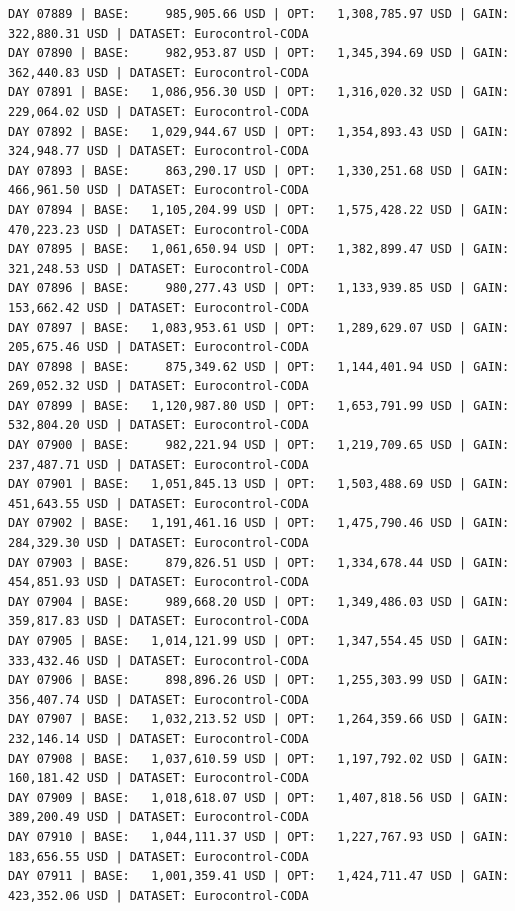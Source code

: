 \documentclass[11pt,a4paper]{article}
\begin{document}
\begin{verbatim}
DAY 07889 | BASE:     985,905.66 USD | OPT:   1,308,785.97 USD | GAIN: 322,880.31 USD | DATASET: Eurocontrol-CODA
DAY 07890 | BASE:     982,953.87 USD | OPT:   1,345,394.69 USD | GAIN: 362,440.83 USD | DATASET: Eurocontrol-CODA
DAY 07891 | BASE:   1,086,956.30 USD | OPT:   1,316,020.32 USD | GAIN: 229,064.02 USD | DATASET: Eurocontrol-CODA
DAY 07892 | BASE:   1,029,944.67 USD | OPT:   1,354,893.43 USD | GAIN: 324,948.77 USD | DATASET: Eurocontrol-CODA
DAY 07893 | BASE:     863,290.17 USD | OPT:   1,330,251.68 USD | GAIN: 466,961.50 USD | DATASET: Eurocontrol-CODA
DAY 07894 | BASE:   1,105,204.99 USD | OPT:   1,575,428.22 USD | GAIN: 470,223.23 USD | DATASET: Eurocontrol-CODA
DAY 07895 | BASE:   1,061,650.94 USD | OPT:   1,382,899.47 USD | GAIN: 321,248.53 USD | DATASET: Eurocontrol-CODA
DAY 07896 | BASE:     980,277.43 USD | OPT:   1,133,939.85 USD | GAIN: 153,662.42 USD | DATASET: Eurocontrol-CODA
DAY 07897 | BASE:   1,083,953.61 USD | OPT:   1,289,629.07 USD | GAIN: 205,675.46 USD | DATASET: Eurocontrol-CODA
DAY 07898 | BASE:     875,349.62 USD | OPT:   1,144,401.94 USD | GAIN: 269,052.32 USD | DATASET: Eurocontrol-CODA
DAY 07899 | BASE:   1,120,987.80 USD | OPT:   1,653,791.99 USD | GAIN: 532,804.20 USD | DATASET: Eurocontrol-CODA
DAY 07900 | BASE:     982,221.94 USD | OPT:   1,219,709.65 USD | GAIN: 237,487.71 USD | DATASET: Eurocontrol-CODA
DAY 07901 | BASE:   1,051,845.13 USD | OPT:   1,503,488.69 USD | GAIN: 451,643.55 USD | DATASET: Eurocontrol-CODA
DAY 07902 | BASE:   1,191,461.16 USD | OPT:   1,475,790.46 USD | GAIN: 284,329.30 USD | DATASET: Eurocontrol-CODA
DAY 07903 | BASE:     879,826.51 USD | OPT:   1,334,678.44 USD | GAIN: 454,851.93 USD | DATASET: Eurocontrol-CODA
DAY 07904 | BASE:     989,668.20 USD | OPT:   1,349,486.03 USD | GAIN: 359,817.83 USD | DATASET: Eurocontrol-CODA
DAY 07905 | BASE:   1,014,121.99 USD | OPT:   1,347,554.45 USD | GAIN: 333,432.46 USD | DATASET: Eurocontrol-CODA
DAY 07906 | BASE:     898,896.26 USD | OPT:   1,255,303.99 USD | GAIN: 356,407.74 USD | DATASET: Eurocontrol-CODA
DAY 07907 | BASE:   1,032,213.52 USD | OPT:   1,264,359.66 USD | GAIN: 232,146.14 USD | DATASET: Eurocontrol-CODA
DAY 07908 | BASE:   1,037,610.59 USD | OPT:   1,197,792.02 USD | GAIN: 160,181.42 USD | DATASET: Eurocontrol-CODA
DAY 07909 | BASE:   1,018,618.07 USD | OPT:   1,407,818.56 USD | GAIN: 389,200.49 USD | DATASET: Eurocontrol-CODA
DAY 07910 | BASE:   1,044,111.37 USD | OPT:   1,227,767.93 USD | GAIN: 183,656.55 USD | DATASET: Eurocontrol-CODA
DAY 07911 | BASE:   1,001,359.41 USD | OPT:   1,424,711.47 USD | GAIN: 423,352.06 USD | DATASET: Eurocontrol-CODA

\end{verbatim}
\end{document}
